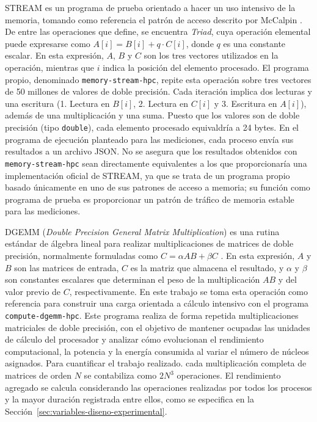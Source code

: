 STREAM es un programa de prueba orientado a hacer un uso intensivo de la memoria, tomando como referencia el patrón de acceso descrito por McCalpin \parencite{mccalpin1995}. De entre las operaciones que define, se encuentra \emph{Triad}, cuya operación elemental puede expresarse como \(A[i] =  B[i] + q \cdot C[i]\), donde \(q\) es una constante escalar. En esta expresión, \(A\), \(B\) y \(C\) son los tres vectores utilizados en la operación, mientras que \(i\) indica la posición del elemento procesado. El programa propio, denominado \texttt{memory-stream-hpc}, repite esta operación sobre tres vectores de 50 millones de valores de doble precisión. Cada iteración implica dos lecturas y una escritura (1. Lectura en \(B[i]\), 2. Lectura en \(C[i]\) y 3. Escritura en \(A[i]\)), además de una multiplicación y una suma. Puesto que los valores son de doble precisión (tipo \texttt{double}), cada elemento procesado equivaldría a 24 bytes. En el programa de ejecución planteado para las mediciones, cada proceso envía sus resultados a un archivo JSON. 
No se asegura que los resultados obtenidos con \texttt{memory-stream-hpc} sean directamente equivalentes a los que proporcionaría una implementación oficial de STREAM, ya que se trata de un programa propio basado únicamente en uno de sus patrones de acceso a memoria; su función como programa de prueba es proporcionar un patrón de tráfico de memoria estable para las mediciones.

DGEMM (\textit{Double Precision General Matrix Multiplication}) es una rutina estándar de álgebra lineal para realizar multiplicaciones de matrices de doble precisión, normalmente formuladas como \(C = \alpha AB + \beta C\) \parencite{netlibDgemm}. En esta expresión, \(A\) y \(B\) son las matrices de entrada, \(C\) es la matriz que almacena el resultado, y \(\alpha\) y \(\beta\) son constantes escalares que determinan el peso de la multiplicación \(AB\) y del valor previo de \(C\), respectivamente. En este trabajo se toma esta operación como referencia para construir una carga orientada a cálculo intensivo con el programa \texttt{compute-dgemm-hpc}. Este programa realiza de forma repetida multiplicaciones matriciales de doble precisión, con el objetivo de mantener ocupadas las unidades de cálculo del procesador y analizar cómo evolucionan el rendimiento computacional, la potencia y la energía consumida al variar el número de núcleos asignados.
Para cuantificar el trabajo realizado. cada multiplicación completa de matrices de orden \(N\) se contabiliza como \(2N^3\) operaciones. El rendimiento agregado se calcula considerando las operaciones realizadas por todos los procesos y la mayor duración registrada entre ellos, como se especifica en la Sección~\ref{sec:variables-diseno-experimental}.


